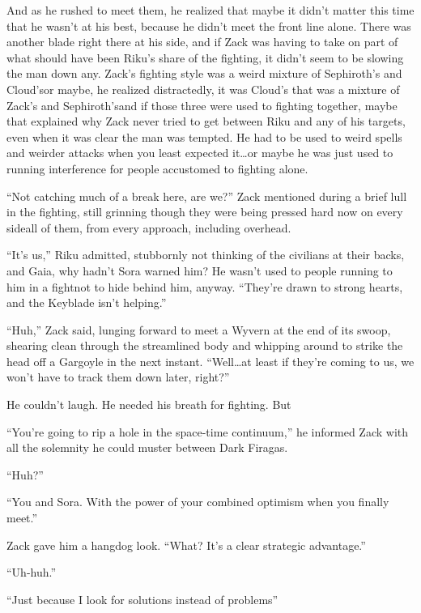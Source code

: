 And as he rushed to meet them, he realized that maybe it didn't matter this time that he wasn't at his best, because he didn't meet the front line alone. There was another blade right there at his side, and if Zack was having to take on part of what should have been Riku's share of the fighting, it didn't seem to be slowing the man down any. Zack's fighting style was a weird mixture of Sephiroth's and Cloud's\textemdash or maybe, he realized distractedly, it was Cloud's that was a mixture of Zack's and Sephiroth's\textemdash and if those three were used to fighting together, maybe that explained why Zack never tried to get between Riku and any of his targets, even when it was clear the man was tempted. He had to be used to weird spells and weirder attacks when you least expected it\ldots or maybe he was just used to running interference for people accustomed to fighting alone.

``Not catching much of a break here, are we?'' Zack mentioned during a brief lull in the fighting, still grinning though they were being pressed hard now on every side\textemdash all of them, from every approach, including overhead.

``It's us,'' Riku admitted, stubbornly not thinking of the civilians at their backs, and Gaia, why hadn't Sora warned him? He wasn't used to people running to him in a fight\textemdash not to hide behind him, anyway. ``They're drawn to strong hearts, and the Keyblade isn't helping.''

``Huh,'' Zack said, lunging forward to meet a Wyvern at the end of its swoop, shearing clean through the streamlined body and whipping around to strike the head off a Gargoyle in the next instant. ``Well\ldots at least if they're coming to us, we won't have to track them down later, right?''

He couldn't laugh. He needed his breath for fighting. But\textemdash 

``You're going to rip a hole in the space-time continuum,'' he informed Zack with all the solemnity he could muster between Dark Firagas.

``Huh?''

``You and Sora. With the power of your combined optimism when you finally meet.''

Zack gave him a hangdog look. ``What? It's a clear strategic advantage.''

``Uh-huh.''

``Just because I look for solutions instead of problems\textemdash ''

